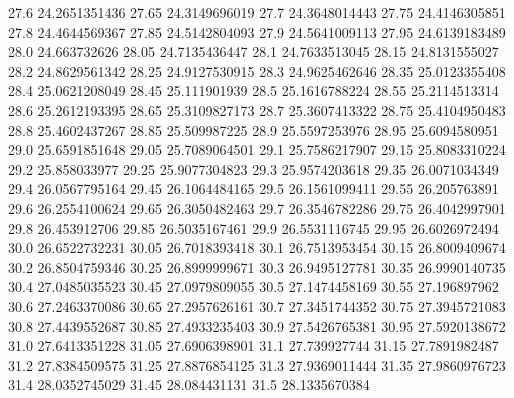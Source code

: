            27.6    24.2651351436
          27.65    24.3149696019
           27.7    24.3648014443
          27.75    24.4146305851
           27.8    24.4644569367
          27.85    24.5142804093
           27.9    24.5641009113
          27.95    24.6139183489
           28.0     24.663732626
          28.05    24.7135436447
           28.1    24.7633513045
          28.15    24.8131555027
           28.2    24.8629561342
          28.25    24.9127530915
           28.3    24.9625462646
          28.35    25.0123355408
           28.4    25.0621208049
          28.45     25.111901939
           28.5    25.1616788224
          28.55    25.2114513314
           28.6    25.2612193395
          28.65    25.3109827173
           28.7    25.3607413322
          28.75    25.4104950483
           28.8    25.4602437267
          28.85     25.509987225
           28.9    25.5597253976
          28.95    25.6094580951
           29.0    25.6591851648
          29.05    25.7089064501
           29.1    25.7586217907
          29.15    25.8083310224
           29.2     25.858033977
          29.25    25.9077304823
           29.3    25.9574203618
          29.35    26.0071034349
           29.4    26.0567795164
          29.45    26.1064484165
           29.5    26.1561099411
          29.55     26.205763891
           29.6    26.2554100624
          29.65    26.3050482463
           29.7    26.3546782286
          29.75    26.4042997901
           29.8     26.453912706
          29.85    26.5035167461
           29.9    26.5531116745
          29.95    26.6026972494
           30.0    26.6522732231
          30.05    26.7018393418
           30.1    26.7513953454
          30.15    26.8009409674
           30.2    26.8504759346
          30.25    26.8999999671
           30.3    26.9495127781
          30.35    26.9990140735
           30.4    27.0485035523
          30.45    27.0979809055
           30.5    27.1474458169
          30.55     27.196897962
           30.6    27.2463370086
          30.65    27.2957626161
           30.7    27.3451744352
          30.75    27.3945721083
           30.8    27.4439552687
          30.85    27.4933235403
           30.9    27.5426765381
          30.95    27.5920138672
           31.0    27.6413351228
          31.05    27.6906398901
           31.1     27.739927744
          31.15    27.7891982487
           31.2    27.8384509575
          31.25    27.8876854125
           31.3    27.9369011444
          31.35    27.9860976723
           31.4    28.0352745029
          31.45     28.084431131
           31.5    28.1335670384
